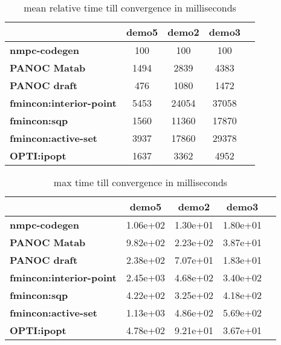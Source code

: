 \begin{table}[H]
	\centering
	\begin{tabular}{|l|c|c|c|c|}
		\hline
		&\textbf{demo5}&\textbf{demo2}&\textbf{demo3}\\\hline
		\textbf{nmpc-codegen}&100&100&100\\\hline
		\textbf{PANOC Matab}&1494&2839&4383\\\hline
		\textbf{PANOC draft}&476&1080&1472\\\hline
		\textbf{fmincon:interior-point}&5453&24054&37058\\\hline
		\textbf{fmincon:sqp}&1560&11360&17870\\\hline
		\textbf{fmincon:active-set}&3937&17860&29378\\\hline
		\textbf{OPTI:ipopt}&1637&3362&4952\\\hline
	\end{tabular}
	\caption{mean relative time till convergence in milliseconds}
	\label{tbl:mean relative time till convergence with noise}
\end{table}

\begin{table}[H]
	\centering
	\begin{tabular}{|l|c|c|c|c|}
		\hline
		&\textbf{demo5}&\textbf{demo2}&\textbf{demo3}\\\hline
		\textbf{nmpc-codegen}&1.06e+02&1.30e+01&1.80e+01\\\hline
		\textbf{PANOC Matab}&9.82e+02&2.23e+02&3.87e+01\\\hline
		\textbf{PANOC draft}&2.38e+02&7.07e+01&1.83e+01\\\hline
		\textbf{fmincon:interior-point}&2.45e+03&4.68e+02&3.40e+02\\\hline
		\textbf{fmincon:sqp}&4.22e+02&3.25e+02&4.18e+02\\\hline
		\textbf{fmincon:active-set}&1.13e+03&4.86e+02&5.69e+02\\\hline
		\textbf{OPTI:ipopt}&4.78e+02&9.21e+01&3.67e+01\\\hline
	\end{tabular}
	\caption{max time till convergence in milliseconds}
	\label{tbl:max time till convergence with noise}
\end{table}

